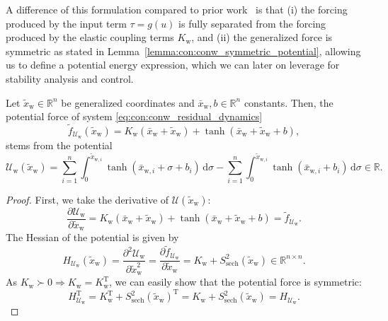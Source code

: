 A difference of this formulation compared to prior work~\citep{rusch2020coupled, rusch2021unicornn, ceni2024random, lanthaler2024neural} is that (i) the forcing produced by the input term $\tau = g(u)$ is fully separated from the forcing produced by the elastic coupling terms $K_\mathrm{w}$, and (ii) the generalized force is symmetric as stated in Lemma~\ref{lemma:con:conw_symmetric_potential}, allowing us to define a potential energy expression, which we can later on leverage for stability analysis and control.

\begin{lemma}\label{lemma:con:conw_symmetric_potential}
    Let $\tilde{x}_\mathrm{w} \in \mathbb{R}^n$ be generalized coordinates and $\bar{x}_\mathrm{w}, b \in \mathbb{R}^n$ constants.
    Then, the potential force of system \eqref{eq:con:conw_residual_dynamics}
    \begin{equation}
        \tilde{f}_{\mathcal{U}_\mathrm{w}}(\tilde{x}_\mathrm{w}) = K_\mathrm{w} (\bar{x}_\mathrm{w} + \tilde{x}_\mathrm{w}) + \tanh(\bar{x}_\mathrm{w} + \tilde{x}_\mathrm{w} + b),
    \end{equation}
    stems from the potential
    \begin{equation}
        \mathcal{U}_\mathrm{w}(\tilde{x}_\mathrm{w}) = \sum_{i=1}^n \int_{0}^{\tilde{x}_{\mathrm{w},i}} \tanh(\bar{x}_{\mathrm{w},i}+\sigma+b_i) \, \mathrm{d} \sigma - \sum_{i=1}^n \int_{0}^{\tilde{x}_{\mathrm{w},i}} \tanh(\bar{x}_{\mathrm{w},i}+b_i) \, \mathrm{d} \sigma \in \mathbb{R}.
    \end{equation}
\end{lemma}
\begin{proof}
    First, we take the derivative of $\mathcal{U}(\tilde{x}_\mathrm{w})$:
    \begin{equation}
        \frac{\partial \mathcal{U}_\mathrm{w}}{\partial \tilde{x}_\mathrm{w}} = K_\mathrm{w} (\bar{x}_\mathrm{w} + \tilde{x}_\mathrm{w}) + \tanh(\bar{x}_\mathrm{w} + \tilde{x}_\mathrm{w} + b) = \tilde{f}_{\mathcal{U}_\mathrm{w}}.
    \end{equation}
    The Hessian of the potential is given by
    \begin{equation}
        H_{\mathcal{U}_\mathrm{w}}(\tilde{x}_\mathrm{w}) = \frac{\partial^2 \mathcal{U}_\mathrm{w}}{\partial \tilde{x}_\mathrm{w}^2} = \frac{\partial \tilde{f}_{\mathcal{U}_\mathrm{w}}}{\partial \tilde{x}_\mathrm{w}}  = K_\mathrm{w} + S_\mathrm{sech}^{2}(\tilde{x}_\mathrm{w}) \in \mathbb{R}^{n \times n}.
    \end{equation}
    As $K_\mathrm{w} \succ 0 \Rightarrow K_\mathrm{w} = K_\mathrm{w}^\mathrm{T}$, we can easily show that the potential force is symmetric:
    \begin{equation}
        H_{\mathcal{U}_\mathrm{w}}^\mathrm{T} = K_\mathrm{w}^\mathrm{T}  + S_\mathrm{sech}^{2}(\tilde{x}_\mathrm{w})^\mathrm{T} = K_\mathrm{w} + S_\mathrm{sech}^{2}(\tilde{x}_\mathrm{w}) = H_{\mathcal{U}_\mathrm{w}}.
    \end{equation}
\end{proof}

